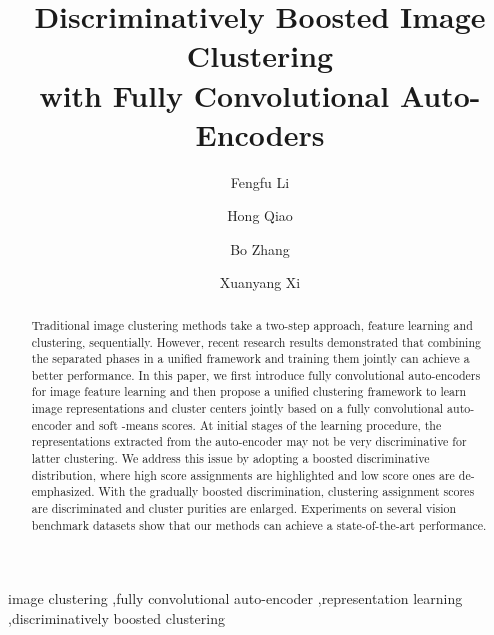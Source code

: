 \documentclass[preprint,12pt]{elsarticle}
\begin{document}
\begin{frontmatter}





\title{Discriminatively Boosted Image Clustering \\ with Fully Convolutional Auto-Encoders}





\author[amss]{Fengfu Li}
\author[ia,brain]{Hong Qiao}
\author[amss]{Bo Zhang} \author[ia]{Xuanyang Xi}

\address[amss]{Academy of Mathematics and Systems Science, Chinese Academy of Sciences\\
Beijing 100190, China\\
and\\
School of Mathematical Sciences, University of Academy of Sciences\\
Beijing 100049, China}
\address[ia]{Institute of Automation, Chinese Academy of Sciences, Beijing 100190, China\\
and \\
University of Academy of Sciences, Beijing 100049, China\\}
\address[brain]{CAS Centre for Excellence in Brain Science and Intelligence Technology\\
Shanghai 200031, China}



\begin{abstract}
Traditional image clustering methods take a two-step approach, feature learning and clustering, sequentially. However, recent research results demonstrated that combining the separated phases in a unified framework and training them jointly can achieve a better performance. In this paper, we first introduce fully convolutional auto-encoders for image feature learning and then propose a unified clustering framework to learn image representations and cluster centers jointly based on a fully convolutional auto-encoder and soft -means scores. At initial stages of the learning procedure, the representations extracted from the auto-encoder may not be very discriminative for latter clustering. We address this issue by adopting a boosted discriminative distribution, where high score assignments are highlighted and low score ones are de-emphasized. With the gradually boosted discrimination, clustering assignment scores are discriminated and cluster purities are enlarged. Experiments on several vision benchmark datasets show that our methods can achieve a state-of-the-art performance.
\end{abstract}

\begin{keyword}
image clustering \sep fully convolutional auto-encoder \sep representation learning \sep discriminatively boosted clustering






\end{keyword}

\end{frontmatter}
\end{document}
